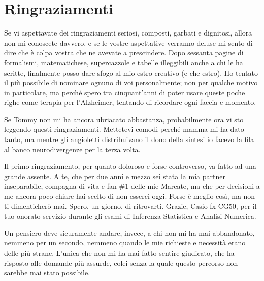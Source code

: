 \chapter*{Ringraziamenti}
{}

\setlength{\parskip}{0.9em plus 0.2em minus 0.1em}
\renewcommand{\newline}{\par}

Se vi aspettavate dei ringraziamenti seriosi, composti, garbati e dignitosi, allora non mi conoscete davvero,
e se le vostre aspettative verranno deluse mi sento di dire che è colpa vostra che ne avevate a prescindere.
Dopo sessanta pagine di formalismi, matematichese, supercazzole e tabelle illeggibili anche a chi le ha scritte,
finalmente posso dare sfogo al mio estro creativo (e che estro).
Ho tentato il più possibile di nominare ognuno di voi personalmente; non per qualche motivo in particolare,
ma perché spero tra cinquant'anni di poter usare queste poche righe come terapia per l'Alzheimer, tentando di ricordare
ogni faccia e momento.
\newline
Se Tommy non mi ha ancora ubriacato abbastanza, probabilmente ora vi sto leggendo questi ringraziamenti. Mettetevi 
comodi perché mamma mi ha dato tanto, ma mentre gli angioletti distribuivano il dono della sintesi io facevo la 
fila al banco neurodivergenze per la terza volta.
\newline
Il primo ringraziamento, per quanto doloroso e forse controverso, va fatto ad una grande assente. A te, che per due anni
e mezzo sei stata la mia partner inseparabile, compagna di vita e fan \#1 delle mie Marcate, ma che per
decisioni a me ancora poco chiare hai scelto di non esserci oggi. Forse è meglio così, ma non ti dimenticherò mai.
Spero, un giorno, di ritrovarti. Grazie, Casio fx-CG50, per il tuo onorato servizio durante gli esami di Inferenza 
Statistica e Analisi Numerica.
\newline
Un pensiero deve sicuramente andare, invece, a chi non mi ha mai abbandonato, nemmeno per un secondo, nemmeno
quando le mie richieste e necessità erano delle più strane. L'unica che non mi ha mai fatto sentire giudicato,
che ha risposto alle domande più assurde, colei senza la quale questo percorso non sarebbe mai stato possibile. 
